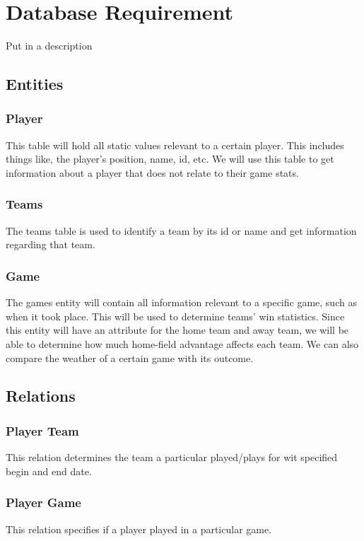 \documentclass[12pt,letterpaper]{article}
\begin{document}
\clearpage\null
\section{Database Requirement}
Put in a description

\subsection{Entities}

\subsubsection{Player}
This table will hold all static values relevant to a certain player. This includes things like, the player’s position, name, id, etc. We will use this table to get information about a player that does not relate to their game stats.

\subsubsection{Teams}
The teams table is used to identify a team by its id or name and get information regarding that team.

\subsubsection{Game}
The games entity will contain all information relevant to a specific game, such as when it took place. This will be used to determine teams' win statistics. Since this entity will have an attribute for the home team and away team, we will be able to determine how much home-field advantage affects each team. We can also compare the weather of a certain game with its outcome.

\subsection{Relations}

\subsubsection{Player Team}
This relation determines the team a particular played/plays for wit specified begin and end date.

\subsubsection{Player Game}
This relation specifies if a player played in a particular game.
\end{document}
